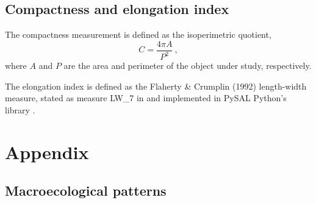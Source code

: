 \subsection{Compactness and elongation index}

The compactness measurement is defined as the isoperimetric quotient,
\begin{equation}
    C=\frac{4\pi A}{P^2} \ ,
\end{equation}
where $A$ and $P$ are the area and perimeter of the object under study,
respectively.

The elongation index is defined as the Flaherty \& Crumplin (1992)
length-width measure, stated as measure LW\_7 in \cite{Altman1998} and
implemented in PySAL Python's library \cite{pysal2007}.

\newpage
\section{Appendix}

\subsection{Macroecological patterns}

